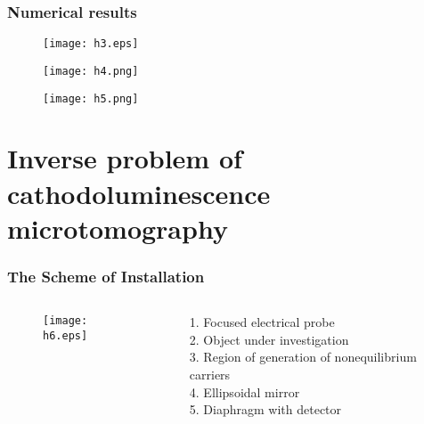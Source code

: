 \documentclass{beamer}
\begin{document}
\begin{frame}[c, allowframebreaks]
\frametitle{Numerical results}

    \begin{figure}[t]
        \texttt{[image: h3.eps]}\label{fig:h3}
    \end{figure}

    \framebreak

    \begin{figure}
        \texttt{[image: h4.png]}\label{fig:h4}
    \end{figure}

    \framebreak

    \begin{figure}
        \texttt{[image: h5.png]}\label{fig:h5}
    \end{figure}

\end{frame}

\section{Inverse problem of cathodoluminescence microtomography}
\begin{frame}
    \sectionpage
\end{frame}

\begin{frame}[c]
    \frametitle{The Scheme of Installation}

    \begin{columns}
        \begin{column}{0.68\textwidth}
            \begin{figure}
                \texttt{[image: h6.eps]}\label{fig:h6}
            \end{figure}
        \end{column}
        \begin{column}{0.28\textwidth}
            1. Focused electrical probe \\
            2. Object under investigation \\
            3. Region of generation of nonequilibrium carriers \\
            4. Ellipsoidal mirror \\
            5. Diaphragm with detector \\
        \end{column}
    \end{columns}

\end{frame}
\end{document}
